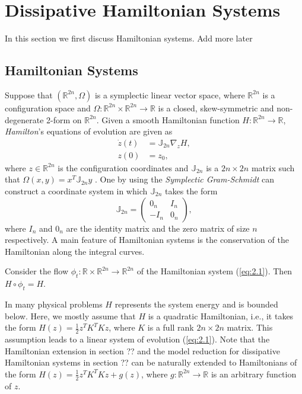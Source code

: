 \section{Dissipative Hamiltonian Systems} \label{sec:2}
In this section we first discuss Hamiltonian systems. Add more later

\subsection{Hamiltonian Systems} Suppose that $(\mathbb{R}^{2n},\Omega)$ is a symplectic linear vector space, where $\mathbb{R}^{2n}$ is a configuration space and $\Omega:\mathbb{R}^{2n}\times \mathbb{R}^{2n} \to \mathbb R$ is a closed, skew-symmetric and non-degenerate 2-form on $\mathbb{R}^{2n}$. Given a smooth Hamiltonian function $H:\mathbb{R}^{2n}\to \mathbb R$, \emph{Hamilton}'s equations of evolution are given as
\begin{equation} \label{eq:2.1}
	\begin{aligned}
	\dot {z}(t) &= \mathbb J_{2n} \nabla_{z} H, \\
	z(0) &= z_0,
	\end{aligned}
\end{equation}
where $z \in\mathbb R^{2n}$ is the configuration coordinates and $\mathbb J_{2n}$ is a $2n\times 2n$ matrix such that $\Omega(x,y) = x^T \mathbb J_{2n} y$ \cite{Marsden:2010:IMS:1965128}. One by using the \emph{Symplectic Gram-Schmidt} \cite{de2006symplectic} can construct a coordinate system in which $\mathbb J_{2n}$ takes the form
\begin{equation} \label{eq:2.2}
	\mathbb{J}_{2n} = 
	\begin{pmatrix}
		0_n & I_n \\
		-I_n & 0_n
	\end{pmatrix},
\end{equation}
where $I_n$ and $0_n$ are the identity matrix and the zero matrix of size $n$ respectively. A main feature of Hamiltonian systems is the conservation of the Hamiltonian along the integral curves.
\begin{theorem} \label{theorem:2.1}
\cite{Marsden:2010:IMS:1965128} Consider the flow $\phi_t:\mathbb R\times \mathbb R^{2n} \to \mathbb R^{2n}$ of the Hamiltonian system (\ref{eq:2.1}). Then $H\circ \phi_t = H$.
\end{theorem}

In many physical problems $H$ represents the system energy and is bounded below. Here, we mostly assume that $H$ is a quadratic Hamiltonian, i.e., it takes the form $H(z) = \frac 1 2 z^T K^T K z$, where $K$ is a full rank $2n\times 2n$ matrix. This assumption leads to a linear system of evolution (\ref{eq:2.1}). Note that the Hamiltonian extension in section ?? and the model reduction for dissipative Hamiltonian systems in section ?? can be naturally extended to Hamiltonians of the form $H(z) = \frac 1 2 z^T K^T K z + g(z)$, where $g:\mathbb R^{2n} \to \mathbb R$ is an arbitrary function of $z$. 

